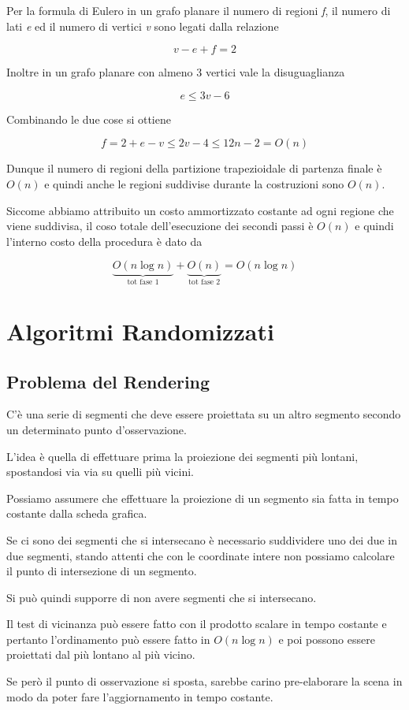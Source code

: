 Per la formula di Eulero in un grafo planare il numero di regioni \textit{f}, il numero di lati \textit{e} ed il numero di vertici \textit{v} sono legati dalla relazione

$$
v -e +f = 2
$$ 

Inoltre in un grafo planare con almeno 3 vertici vale la disuguaglianza

$$
e \leq 3v -6
$$

Combinando le due cose si ottiene

$$
f = 2 + e -v \leq 2v - 4 \leq 12n -2 = O(n)
$$

Dunque il numero di regioni della partizione trapezioidale di partenza finale è $O(n)$ e quindi anche le regioni suddivise durante la costruzioni sono $O(n)$.

Siccome abbiamo attribuito un costo ammortizzato costante ad ogni regione che viene suddivisa, il coso totale dell'esecuzione dei secondi passi è $O(n)$ e quindi l'interno costo della procedura è dato da

$$
\underbrace{O(n \log n)}_{\text{tot fase 1}} + \underbrace{O(n)}_{\text{tot fase 2}} = O(n \log n)
$$



\chapter{Algoritmi Randomizzati}

\section{Problema del Rendering}\label{problema-del-rendering}

C'è una serie di segmenti che deve essere proiettata su un altro segmento secondo un determinato punto d'osservazione.

L'idea è quella di effettuare prima la proiezione dei segmenti più lontani, spostandosi via via su quelli più vicini.

Possiamo assumere che effettuare la proiezione di un segmento sia fatta in tempo costante dalla scheda grafica.

Se ci sono dei segmenti che si intersecano è necessario suddividere uno dei due in due segmenti, stando attenti che con le coordinate intere non possiamo calcolare il punto di intersezione di un segmento.

Si può quindi supporre di non avere segmenti che si intersecano.

Il test di vicinanza può essere fatto con il prodotto scalare in tempo costante e pertanto l'ordinamento può essere fatto in $O(n \log n)$ e poi possono essere proiettati dal più lontano al più vicino.

Se però il punto di osservazione si sposta, sarebbe carino pre-elaborare la scena in modo da poter fare l'aggiornamento in tempo costante.
